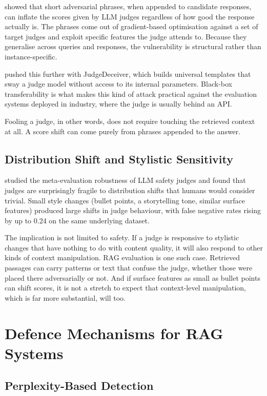 \citet{raina2024llm} showed that short adversarial phrases, when appended to candidate responses, can inflate the scores given by LLM judges regardless of how good the response actually is. The phrases come out of gradient-based optimisation against a set of target judges and exploit specific features the judge attends to. Because they generalise across queries and responses, the vulnerability is structural rather than instance-specific.

\citet{shi2024judgedeceiver} pushed this further with JudgeDeceiver, which builds universal templates that sway a judge model without access to its internal parameters. Black-box transferability is what makes this kind of attack practical against the evaluation systems deployed in industry, where the judge is usually behind an API.

Fooling a judge, in other words, does not require touching the retrieved context at all. A score shift can come purely from phrases appended to the answer.

\subsection{Distribution Shift and Stylistic Sensitivity}

\citet{eiras2025know} studied the meta-evaluation robustness of LLM safety judges and found that judges are surprisingly fragile to distribution shifts that humans would consider trivial. Small style changes (bullet points, a storytelling tone, similar surface features) produced large shifts in judge behaviour, with false negative rates rising by up to 0.24 on the same underlying dataset.

The implication is not limited to safety. If a judge is responsive to stylistic changes that have nothing to do with content quality, it will also respond to other kinds of context manipulation. RAG evaluation is one such case. Retrieved passages can carry patterns or text that confuse the judge, whether those were placed there adversarially or not. And if surface features as small as bullet points can shift scores, it is not a stretch to expect that context-level manipulation, which is far more substantial, will too.

\section{Defence Mechanisms for RAG Systems}

\subsection{Perplexity-Based Detection}

